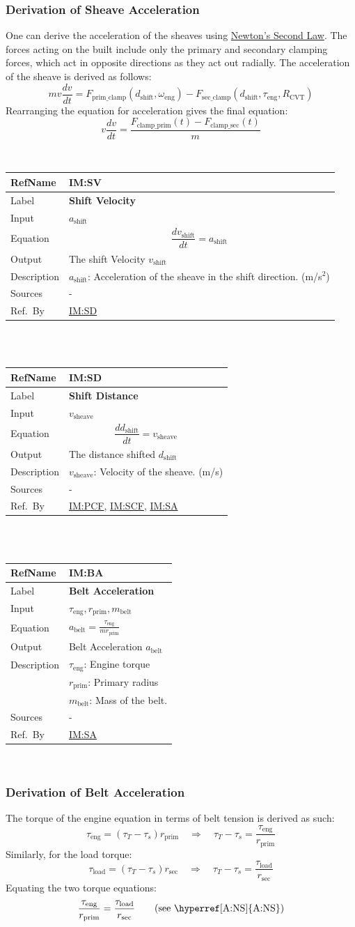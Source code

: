 \documentclass[12pt]{article}
\newcommand{\colAwidth}{0.13\textwidth}
\newcommand{\colBwidth}{0.82\textwidth}
\newcommand{\hpref}[1]{\hyperref[#1]{#1}}
\newcommand{\definstance}[8] {
~\newline
\noindent
\begin{minipage}{\textwidth}
\renewcommand*{\arraystretch}{1.5}
\begin{tabular}{| p{\colAwidth} | p{\colBwidth}|}
  \hline
  \rowcolor[gray]{0.9}
  RefName& \textbf{#1} \label{#1}\\
  \hline
  Label& \bf #2 \\
  \hline
  Input& #3\\
  \hline
  Equation& #4\\
  \hline
  Output& #5\\
  \hline
  Description& #6 \\
  \hline
  Sources& #7 \\
  \hline
  Ref.\ By & #8\\
  \hline
\end{tabular}
\end{minipage}\\
}
\begin{document}
\subsubsection*{Derivation of Sheave Acceleration}
One can derive the acceleration of the sheaves using \hyperref[TM:N2]{Newton's Second Law}. The forces acting on the built include 
only the primary and secondary clamping forces, which act in opposite directions as they act out radially.
The acceleration of the sheave is derived as follows:
\[mv\frac{dv}{dt} = F_{\text{prim\_clamp}}(d_\text{shift}, \omega_\text{eng}) - F_{\text{sec\_clamp}}(d_\text{shift}, \tau_\text{eng}, R_{\text{CVT}})\]
Rearranging the equation for acceleration gives the final equation:
\[v\frac{dv}{dt} = \frac{F_{\text{clamp\_prim}}(t) - F_{\text{clamp\_sec}}(t)}{m}\]

\definstance
{IM:SV}
{Shift Velocity}
{$a_\text{shift}$} %
{\[
\frac{dv_\text{shift}}{dt} = a_\text{shift}
\]} %
{The shift Velocity $v_\text{shift}$} %
{
  $a_\text{shift}$: Acceleration of the sheave in the shift direction. (m/s$^2$)
} %
{-}
{\hpref{IM:SD}}

\definstance
{IM:SD}
{Shift Distance}
{$v_\text{sheave}$} %
{\[
\frac{dd_\text{shift}}{dt} = v_\text{sheave}
\]} %
{The distance shifted $d_\text{shift}$} %
{
  $v_\text{sheave}$: Velocity of the sheave. (m/s)
} %
{-}
{\hpref{IM:PCF}, \hpref{IM:SCF}, \hpref{IM:SA}}


\definstance
{IM:BA}
{Belt Acceleration}
{$\tau_{\text{eng}}, r_{\text{prim}}, m_\text{belt}$ } %
{$a_{\text{belt}} = \frac{\tau_{\text{eng}}}{m r_{\text{prim}}}$} %
{Belt Acceleration $a_{\text{belt}}$} %
{$\tau_{\text{eng}}$: Engine torque\\
   &$r_{\text{prim}}$: Primary radius\\
   &$m_\text{belt}$: Mass of the belt.} %
{-} %
{\hpref{IM:SA}} %
\subsubsection*{Derivation of Belt Acceleration}

The torque of the engine equation in terms of belt tension is derived as such: \\
\[\tau_{\text{eng}} = (\tau_T - \tau_s) r_{\text{prim}} \quad \Rightarrow \quad \tau_T - \tau_s = \frac{\tau_{\text{eng}}}{r_{\text{prim}}}\] %
Similarly, for the load torque: \\
\[\tau_{\text{load}} = (\tau_T - \tau_s) r_{\text{sec}} \quad \Rightarrow \quad \tau_T - \tau_s = \frac{\tau_{\text{load}}}{r_{\text{sec}}}\] %
Equating the two torque equations: \\
\[\frac{\tau_{\text{eng}}}{r_{\text{prim}}} = \frac{\tau_{\text{load}}}{r_{\text{sec}}} \tag*{\text{(see \hpref{A:NS})}}\] 
{\newline}
\end{document}
